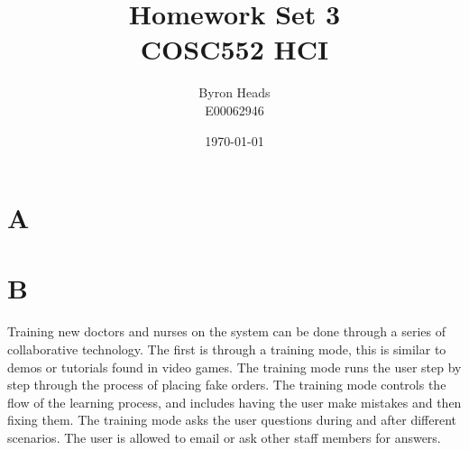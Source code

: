 \documentclass[12pt]{article}
\title{Homework Set 3 \\
    COSC552 HCI}
\author{ Byron Heads \\
    E00062946 }
\date{\today}
\begin{document}
\maketitle

\section*{A}

\section*{B}

Training new doctors and nurses on the system can be done through a 
series of collaborative technology.  The first is through a training mode,
this is similar to demos or tutorials found in video games.  The training
mode runs the user step by step through the process of placing fake orders.
The training mode controls the flow of the learning process, and includes 
having the user make mistakes and then fixing them.  The training mode 
asks the user questions during and after different scenarios.  The user is
allowed to email or ask other staff members for answers.
\end{document}
